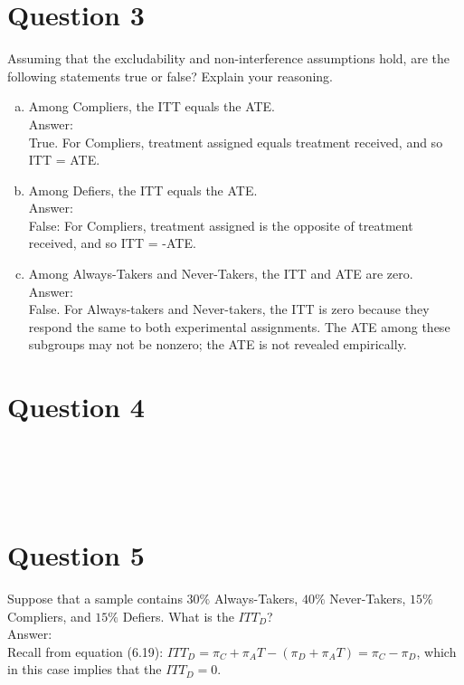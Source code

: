 \documentclass[11pt,notitlepage]{article}\usepackage[]{graphicx}\usepackage[]{color}
\makeatletter
\newenvironment{kframe}{%
 \def\at@end@of@kframe{}%
 \ifinner\ifhmode%
  \def\at@end@of@kframe{\end{minipage}}%
  \begin{minipage}{\columnwidth}%
 \fi\fi%
 \def\FrameCommand##1{\hskip\@totalleftmargin \hskip-\fboxsep
 \colorbox{shadecolor}{##1}\hskip-\fboxsep
     \hskip-\linewidth \hskip-\@totalleftmargin \hskip\columnwidth}%
 \MakeFramed {\advance\hsize-\width
   \@totalleftmargin\z@ \linewidth\hsize
   \@setminipage}}%
 {\par\unskip\endMakeFramed%
 \at@end@of@kframe}
\newenvironment{knitrout}{}{} %
\makeatother
\begin{document}
\section*{Question 3}
Assuming that the excludability and non-interference assumptions hold, are the following statements true or false? Explain your reasoning.
\begin{enumerate}[a)]
\item Among Compliers, the ITT equals the ATE. \\
Answer:\\
True. For Compliers, treatment assigned equals treatment received, and so ITT = ATE.
\item Among Defiers, the ITT equals the ATE.\\
Answer:\\
False:  For Compliers, treatment assigned is the opposite of treatment received, and so ITT = -ATE.
\item Among Always-Takers and Never-Takers, the ITT and ATE are zero.\\
Answer: \\
False. For Always-takers and Never-takers, the ITT is zero because they respond the same to both experimental assignments. The ATE among these subgroups may not be nonzero; the ATE is not revealed empirically.
\end{enumerate}

\section*{Question 4}
\begin{knitrout}
\color{fgcolor}\begin{kframe}
\begin{verbatim}





\end{verbatim}
\end{kframe}
\end{knitrout}


\section*{Question 5}
Suppose that a sample contains $30\%$ Always-Takers, $40\%$ Never-Takers, $15\%$ Compliers, and $15\%$ Defiers. What is the $ITT_D$? \\
Answer:\\
Recall from equation (6.19): $ITT_D= \pi_C+ \pi_AT- (\pi_D + \pi_AT) = \pi_C- \pi_D$, which in this case implies that the $ITT_D = 0$.
\end{document}
